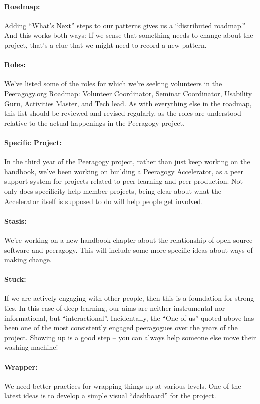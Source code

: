 \paragraph{Roadmap:} Adding ``What's Next'' steps to our patterns gives us a ``distributed roadmap.''  And this works both ways:  
If we sense that something needs to change about the project, that's a
clue that we might need to record a new pattern.

\paragraph{Roles:} We’ve listed some of the roles for which we’re seeking volunteers in
the Peeragogy.org Roadmap: Volunteer Coordinator, Seminar Coordinator,
Usability Guru, Activities Master, and Tech lead. As with everything
else in the roadmap, this list should be reviewed and revised
regularly, as the roles are understood relative to the actual
happenings in the Peeragogy project.

\paragraph{Specific Project:} In the third year of the Peeragogy project, rather than just keep
working on the handbook, we’ve been working on building a Peeragogy
Accelerator, as a peer support system for projects related to peer
learning and peer production. Not only does specificity help member
projects, being clear about what the Accelerator itself is supposed to
do will help people get involved.

\paragraph{Stasis:} We’re working on a new handbook chapter about the relationship of open
source software and peeragogy. This will include some more specific
ideas about ways of making change.

\paragraph{Stuck:} If we are actively engaging with other people, then this is a foundation
for strong ties. In this case of deep learning, our aims are neither
instrumental nor informational, but “interactional”. Incidentally, the
“One of us” quoted above has been one of the most consistently engaged
peeragogues over the years of the project. Showing up is a good step –
you can always help someone else move their washing machine!

\paragraph{Wrapper:}  We need better practices for wrapping things up at
various levels.  One of the latest ideas is to develop a simple visual
``dashboard'' for the project.
